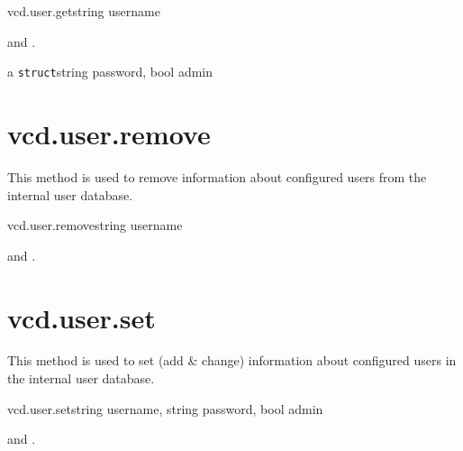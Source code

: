 \begin{rpcsynopsis}{vcd.user.get}{string username}
\end{rpcsynopsis}

\begin{rpcaccess}
 and \rpcnoownerchecks.
\end{rpcaccess}

\begin{rpcreturncomplex}{a \texttt{struct}}{string password, bool admin}
\end{rpcreturncomplex}


\section{vcd.user.remove}

This method is used to remove information about configured users from the
internal user database.

\begin{rpcsynopsis}{vcd.user.remove}{string username}
\end{rpcsynopsis}

\begin{rpcaccess}
 and \rpcnoownerchecks.
\end{rpcaccess}

\rpcreturnnil

\rpcnoerrors


\section{vcd.user.set}

This method is used to set (add \& change) information about configured users
in the internal user database.

\begin{rpcsynopsis}{vcd.user.set}{string username, string password,
	bool admin}
\end{rpcsynopsis}

\begin{rpcaccess}
 and \rpcnoownerchecks.
\end{rpcaccess}

\rpcreturnnil

\rpcnoerrors


